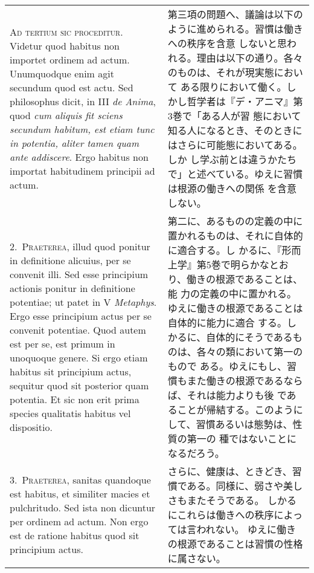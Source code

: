 \documentclass[10pt]{jsarticle} %
\begin{document}
\begin{longtable}{p{21em}p{21em}}
{\scshape Ad tertium sic proceditur}. Videtur quod habitus non importet ordinem
ad actum. Unumquodque enim agit secundum quod est actu. Sed
philosophus dicit, in III {\itshape de Anima}, quod {\itshape cum aliquis fit sciens
secundum habitum, est etiam tunc in potentia, aliter tamen quam ante
addiscere}. Ergo habitus non importat habitudinem principii ad actum.

&

第三項の問題へ、議論は以下のように進められる。習慣は働きへの秩序を含意
しないと思われる。理由は以下の通り。各々のものは、それが現実態において
ある限りにおいて働く。しかし哲学者は『デ・アニマ』第3巻で「ある人が習
態において知る人になるとき、そのときにはさらに可能態においてある。しか
し学ぶ前とは違うかたちで」と述べている。ゆえに習慣は根源の働きへの関係
を含意しない。

\\



2.~{\scshape Praeterea}, illud quod ponitur in definitione alicuius, per se convenit
illi. Sed esse principium actionis ponitur in definitione potentiae;
ut patet in V {\itshape Metaphys}. Ergo esse principium actus per se convenit
potentiae. Quod autem est per se, est primum in unoquoque genere. Si
ergo etiam habitus sit principium actus, sequitur quod sit posterior
quam potentia. Et sic non erit prima species qualitatis habitus vel
dispositio.

&

第二に、あるものの定義の中に置かれるものは、それに自体的に適合する。し
かるに、『形而上学』第5巻で明らかなとおり、働きの根源であることは、能
力の定義の中に置かれる。ゆえに働きの根源であることは自体的に能力に適合
する。しかるに、自体的にそうであるものは、各々の類において第一のもので
ある。ゆえにもし、習慣もまた働きの根源であるならば、それは能力よりも後
であることが帰結する。このようにして、習慣あるいは態勢は、性質の第一の
種ではないことになるだろう。


\\



3.~{\scshape Praeterea}, sanitas quandoque est habitus, et similiter macies et
pulchritudo. Sed ista non dicuntur per ordinem ad actum. Non ergo est
de ratione habitus quod sit principium actus.

&

さらに、健康は、ときどき、習慣である。同様に、弱さや美しさもまたそうである。
しかるにこれらは働きへの秩序によっては言われない。
ゆえに働きの根源であることは習慣の性格に属さない。


\end{longtable}
\end{document}
